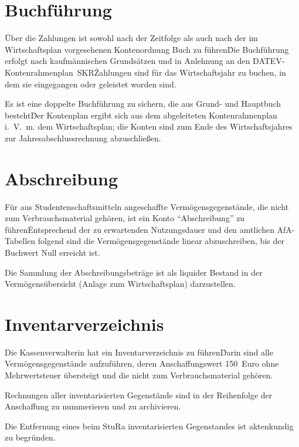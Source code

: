 \section{Buchführung}

\Abs \Satz Über die Zahlungen ist sowohl nach der Zeitfolge als auch nach der im Wirtschaftsplan vorgesehenen Kontenordnung Buch zu führen\. Die Buchführung erfolgt nach kaufmännischen Grundsätzen und in Anlehnung an den DATEV-Kontenrahmenplan~SKR\. Zahlungen sind für das Wirtschaftsjahr zu buchen, in dem sie eingegangen oder geleistet worden sind.

\Abs \Satz Es ist eine doppelte Buchführung zu sichern, die aus Grund- und Hauptbuch besteht\. Der Kontenplan ergibt sich aus dem abgeleiteten Kontenrahmenplan i.~V.~m. dem Wirtschaftsplan; die Konten sind zum Ende des Wirtschaftsjahres zur Jahresabschlussrechnung abzuschließen.



\section{Abschreibung}

\Abs \Satz Für aus Studentenschaftsmitteln angeschaffte Vermögensgegenstände, die nicht zum Verbrauchsmaterial gehören, ist ein Konto "`Abschreibung"' zu führen\. Entsprechend der zu erwartenden Nutzungsdauer und den amtlichen AfA-Tabellen folgend sind die Vermögensgegenstände linear abzuschreiben, bis der Buchwert Null erreicht ist.

\Abs \Satz Die Sammlung der Abschreibungsbeträge ist als liquider Bestand in der Vermögensübersicht (Anlage zum Wirtschaftsplan) darzustellen.



\section{Inventarverzeichnis}

\Abs \Satz Die Kassenverwalterin hat ein Inventarverzeichnis zu führen\. Darin sind alle Vermögensgegenstände aufzuführen, deren Anschaffungswert 150~Euro ohne Mehrwertsteuer übersteigt und die nicht zum Verbrauchsmaterial gehören.

\Abs \Satz Rechnungen aller inventarisierten Gegenstände sind in der Reihenfolge der Anschaffung zu nummerieren und zu archivieren.

\Abs \Satz Die Entfernung eines beim StuRa inventarisierten Gegenstandes ist aktenkundig zu begründen.

